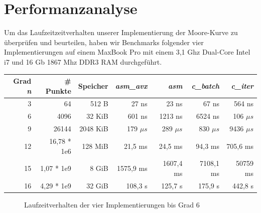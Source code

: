 \documentclass[course=erap]{aspdoc}
\begin{document}
\FloatBarrier
\section{Performanzanalyse}
Um das Laufzeitzeitverhalten unserer Implementierung der Moore-Kurve zu überprüfen und beurteilen, haben wir Benchmarks folgender vier Implementierungen auf einem MaxBook Pro mit einem 3,1 Ghz Dual-Core Intel i7 und 16 Gb 1867 Mhz DDR3 RAM durchgeführt.

\begin{center}
    \begin{tabular}{| r | r | r | r | r | r | r |}
    \hline
    Grad \textit{n} & \# Punkte & Speicher & \textit{asm\_avx} & \textit{asm} & \textit{c\_batch} & \textit{c\_iter}  \\ \hline
    3 & 64 & 512 B  & 27 ns & 23 ns & 67 ns & 564 ns \\  \hline
    6 & 4096 & 32 KiB  & 601 ns & 1213 ns & 6524 ns & 106 $\mu s$ \\  \hline
    9 & 26144 & 2048 KiB  & 179 $\mu s$ & 289 $\mu s$ & 830 $\mu s$ & 9436 $\mu s$  \\  \hline
    12 & 16,78 * 1e6 & 128 MiB & 21,5 ms & 24,5 ms & 94,3 ms & 705,6 ms \\ \hline
    15 & 1,07 * 1e9 & 8 GiB & 1575,9 ms & 1607,4 ms & 7108,1 ms & 50759 ms \\ \hline
    16 & 4,29 * 1e9 & 32 GiB & 108,3 s & 125,7 s & 175,9 s & 442,8 s \\ \hline
    \end{tabular}
\end{center}

\begin{figure}[htbp] 
    \centering
    \qquad
    \caption{Laufzeitverhalten der vier Implementierungen bis Grad 6}%
    \label{fig:Laufzeitvergleich}%
 \end{figure}
 
\end{document}
